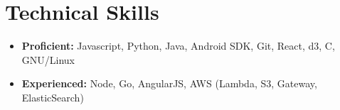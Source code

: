 \documentclass[letterpaper,11pt]{article}
\newcommand{\resumeSubHeadingListStart}{\begin{itemize}[leftmargin=*]}
\newcommand{\resumeSubHeadingListEnd}{\end{itemize}}
\begin{document}
\section{Technical Skills}
  \resumeSubHeadingListStart
    \item{
            \textbf{Proficient:} {Javascript, Python, Java, Android SDK, Git, React, d3, C, GNU/Linux}
    }
    \item {
            \textbf{Experienced:} {Node, Go, AngularJS, AWS (Lambda, S3, Gateway, ElasticSearch)}
    }
 \resumeSubHeadingListEnd


\end{document}
